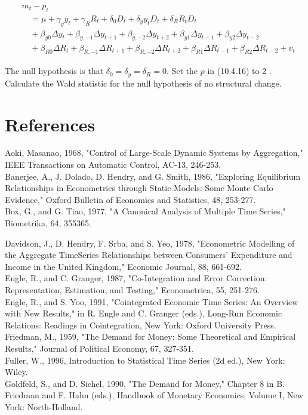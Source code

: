 \documentclass[10pt]{article}
\begin{document}
$$
\begin{aligned}
& m_{t}-p_{t} \\
& \quad=\mu+\gamma_{y} y_{t}+\gamma_{R} R_{t}+\delta_{0} D_{t}+\delta_{y} y_{t} D_{t}+\delta_{R} R_{t} D_{t} \\
& \quad+\beta_{y 0} \Delta y_{t}+\beta_{y,-1} \Delta y_{t+1}+\beta_{y,-2} \Delta y_{t+2}+\beta_{y 1} \Delta y_{t-1}+\beta_{y 2} \Delta y_{t-2} \\
& \quad+\beta_{R 0} \Delta R_{t}+\beta_{R,-1} \Delta R_{t+1}+\beta_{R,-2} \Delta R_{t+2}+\beta_{R 1} \Delta R_{t-1}+\beta_{R 2} \Delta R_{t-2}+v_{t}
\end{aligned}
$$

The null hypothesis is that $\delta_{0}=\delta_{y}=\delta_{R}=0$. Set the $p$ in (10.4.16) to 2 . Calculate the Wald statistic for the null hypothesis of no structural change.

\section*{References}
Aoki, Masanao, 1968, "Control of Large-Scale Dynamic Systems by Aggregation," IEEE Transactions on Automatic Control, AC-13, 246-253.\\
Banerjee, A., J. Dolado, D. Hendry, and G. Smith, 1986, "Exploring Equilibrium Relationships in Econometrics through Static Models: Some Monte Carlo Evidence," Oxford Bulletin of Economics and Statistics, 48, 253-277.\\
Box, G., and G. Tiao, 1977, "A Canonical Analysis of Multiple Time Series," Biometrika, 64, 355365.

Davidson, J., D. Hendry, F. Srba, and S. Yeo, 1978, "Econometric Modelling of the Aggregate TimeSeries Relationships between Consumers' Expenditure and Income in the United Kingdom," Economic Journal, 88, 661-692.\\
Engle, R., and C. Granger, 1987, "Co-Integration and Error Correction: Representation, Estimation, and Testing," Econometrica, 55, 251-276.\\
Engle, R., and S. Yoo, 1991, "Cointegrated Economic Time Series: An Overview with New Results," in R. Engle and C. Granger (eds.), Long-Run Economic Relations: Readings in Cointegration, New York: Oxford University Press.\\
Friedman, M., 1959, "The Demand for Money: Some Theoretical and Empirical Results," Journal of Political Economy, 67, 327-351.\\
Fuller, W., 1996, Introduction to Statistical Time Series (2d ed.), New York: Wiley.\\
Goldfeld, S., and D. Sichel, 1990, "The Demand for Money," Chapter 8 in B. Friedman and F. Hahn (eds.), Handbook of Monetary Economics, Volume I, New York: North-Holland.
\end{document}

